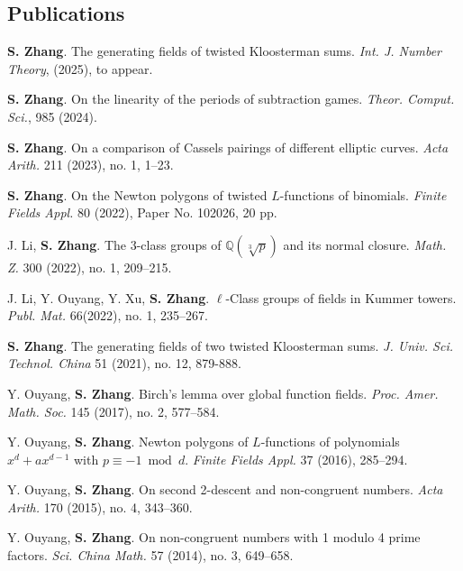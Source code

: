 \documentclass[11pt]{article}
\begin{document}
\subsection{Publications}
\begin{cvlist}
	\item \textbf{S. Zhang}.
	The generating fields of twisted Kloosterman sums.
	{\em Int. J. Number Theory}, (2025), to appear.

	\item \textbf{S. Zhang}.
	On the linearity of the periods of subtraction games.
	{\em Theor. Comput. Sci.}, 985 (2024).
	
	\item \textbf{S. Zhang}.
	On a comparison of Cassels pairings of different elliptic curves.
	{\em Acta Arith.} 211 (2023), no. 1, 1--23.
	
	\item \textbf{S. Zhang}.
	On the Newton polygons of twisted $L$-functions of binomials.
	{\em Finite Fields Appl.} 80 (2022), Paper No. 102026, 20 pp.

	\item J. Li, \textbf{S. Zhang}.
	The $3$-class groups of $\mathbb{Q}(\sqrt[3]{p})$ and its normal closure.
	{\em Math. Z.} 300 (2022), no. 1, 209--215.

	\item J. Li, Y. Ouyang, Y. Xu, \textbf{S. Zhang}.
	$\ell$-Class groups of fields in Kummer towers.
	{\em Publ. Mat.} 66(2022), no. 1, 235--267.

	\item \textbf{S. Zhang}.
	The generating fields of two twisted Kloosterman sums.
	{\em J. Univ. Sci. Technol. China} 51 (2021), no. 12, 879-888.

	\item Y. Ouyang, \textbf{S. Zhang}.
	Birch's lemma over global function fields.
	{\em Proc. Amer. Math. Soc.} 145 (2017), no. 2, 577--584.

	\item Y. Ouyang, \textbf{S. Zhang}.
	Newton polygons of $L$-functions of polynomials $x^d+ax^{d-1}$ with $p\equiv -1 \bmod d$.
	{\em Finite Fields Appl.} 37 (2016), 285--294.

	\item Y. Ouyang, \textbf{S. Zhang}.
	On second 2-descent and non-congruent numbers.
	{\em Acta Arith.} 170 (2015), no. 4, 343--360.

	\item Y. Ouyang, \textbf{S. Zhang}.
	On non-congruent numbers with 1 modulo 4 prime factors.
	{\em Sci. China Math.} 57 (2014), no. 3, 649--658.
\end{cvlist}
\end{document}
